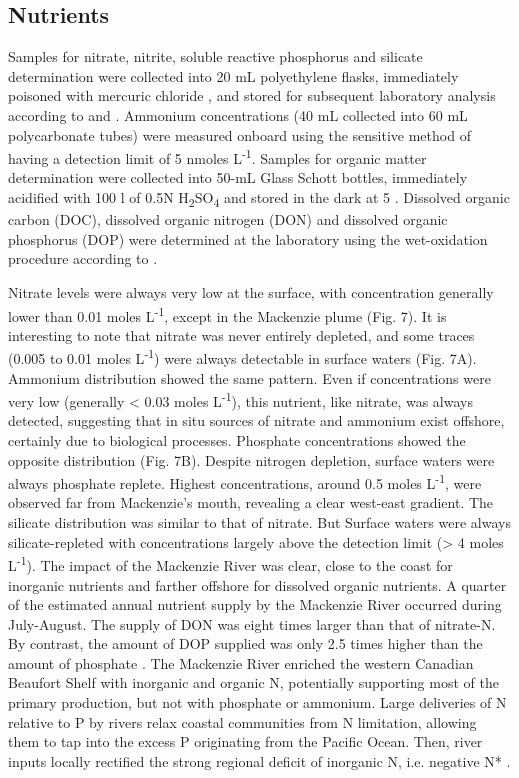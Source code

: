 \documentclass[essd, manuscript]{copernicus}
\begin{document}
\subsection{Nutrients}

Samples for nitrate, nitrite, soluble reactive phosphorus and silicate determination were collected into 20 mL polyethylene flasks, immediately poisoned with mercuric chloride \citep{Kirkwood1992}, and stored for subsequent laboratory analysis according to \citet{Raimbault1990} and \citet{Aminot2007}. Ammonium concentrations (40 mL collected into 60 mL polycarbonate tubes) were measured onboard using the sensitive method of \citet{Holmes1999} having a detection limit of 5 nmoles L\textsuperscript{-1}. Samples for organic matter determination were collected into 50-mL Glass Schott bottles, immediately acidified with 100 \textmu l of 0.5N H\textsubscript{2}SO\textsubscript{4}  and stored in the dark at 5 \textcelsius. Dissolved organic carbon (DOC), dissolved organic nitrogen (DON) and dissolved organic phosphorus (DOP) were determined at the laboratory using the wet-oxidation procedure according to \citet{Raimbault1999a}.

Nitrate levels were always very low at the surface, with concentration generally lower than 0.01 \textmu moles L\textsuperscript{-1}, except in the Mackenzie plume (Fig. 7). It is interesting to note that nitrate was never entirely depleted, and some traces (0.005 to 0.01 \textmu moles L\textsuperscript{-1}) were always detectable in surface waters (Fig. 7A). Ammonium distribution showed the same pattern. Even if concentrations were very low (generally < 0.03 \textmu moles L\textsuperscript{-1}), this nutrient, like nitrate, was always detected, suggesting that in situ sources of nitrate and ammonium exist offshore, certainly due to biological processes. Phosphate concentrations showed the opposite distribution (Fig. 7B). Despite nitrogen depletion, surface waters were always phosphate replete. Highest concentrations, around 0.5 \textmu moles L\textsuperscript{-1}, were observed far from Mackenzie’s mouth, revealing a clear west-east gradient. The silicate distribution was similar to that of nitrate. But Surface waters were always silicate-repleted with concentrations largely above the detection limit (> 4 \textmu moles L\textsuperscript{-1}). The impact of the Mackenzie River was clear, close to the coast for inorganic nutrients and farther offshore for dissolved organic nutrients. A quarter of the estimated annual nutrient supply by the Mackenzie River occurred during July-August. The supply of DON was eight times larger than that of nitrate-N. By contrast, the amount of DOP supplied was only 2.5 times higher than the amount of phosphate \citep{Tremblay2014}. The Mackenzie River enriched the western Canadian Beaufort Shelf with inorganic and organic N, potentially supporting most of the primary production, but not with phosphate or ammonium. Large deliveries of N relative to P by rivers relax coastal communities from N limitation, allowing them to tap into the excess P originating from the Pacific Ocean. Then, river inputs locally rectified the strong regional deficit of inorganic N, i.e. negative N* \citep{Tremblay2014}.
\end{document}
